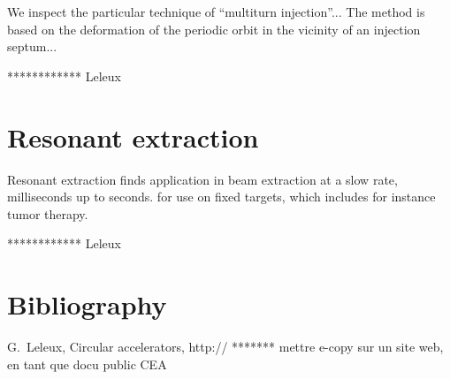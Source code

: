 We inspect  the particular technique of ``multiturn injection''...
The method is based on the deformation of the periodic orbit in the vicinity of an injection septum...

************ Leleux



\section{Resonant extraction \label{secSynchSlowXtr}}

Resonant extraction finds application in beam extraction at a slow rate, milliseconds up to seconds. 
for use on fixed targets, which includes for instance tumor therapy. 

************ Leleux




\section{Bibliography \label{SecBiblioSynch}}

G.~Leleux, Circular accelerators, http://  ******* mettre e-copy sur un site web, en tant que docu public CEA 


